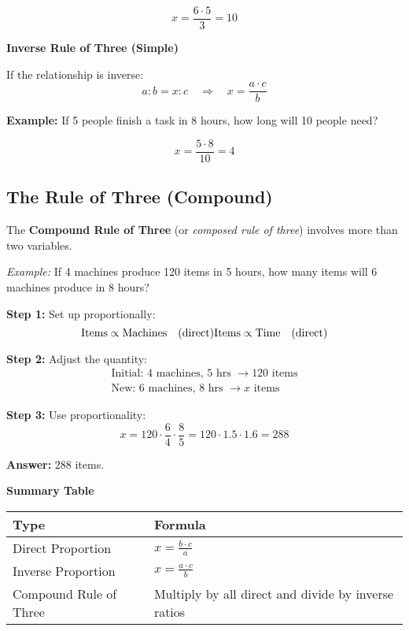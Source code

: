 \[
x = \frac{6 \cdot 5}{3} = 10
\]

\textbf{Inverse Rule of Three (Simple)}

If the relationship is inverse:
\[
a : b = x : c \quad \Rightarrow \quad x = \frac{a \cdot c}{b}
\]

\textbf{Example:} If 5 people finish a task in 8 hours, how long will 10 people need?

\[
x = \frac{5 \cdot 8}{10} = 4
\]

\subsection{The Rule of Three (Compound)}

The \textbf{Compound Rule of Three} (or \textit{composed rule of three}) involves more than two variables.

\textit{Example:} If 4 machines produce 120 items in 5 hours, how many items will 6 machines produce in 8 hours?

\textbf{Step 1:} Set up proportionally:
\[
\text{Items} \propto \text{Machines} \quad (\text{direct}) \\
\text{Items} \propto \text{Time} \quad (\text{direct})
\]

\textbf{Step 2:} Adjust the quantity:
\begin{align*}
\text{Initial: } 4 \text{ machines, } 5 \text{ hrs } \rightarrow 120 \text{ items} \\
\text{New: } 6 \text{ machines, } 8 \text{ hrs } \rightarrow x \text{ items}
\end{align*}

\textbf{Step 3:} Use proportionality:
\[
x = 120 \cdot \frac{6}{4} \cdot \frac{8}{5} = 120 \cdot 1.5 \cdot 1.6 = 288
\]

\textbf{Answer:} 288 items.

\textbf{Summary Table}

\begin{center}
\begin{tabular}{|l|l|}
\hline
\textbf{Type} & \textbf{Formula} \\
\hline
Direct Proportion & \(x = \frac{b \cdot c}{a}\) \\
Inverse Proportion & \(x = \frac{a \cdot c}{b}\) \\
Compound Rule of Three & Multiply by all direct and divide by inverse ratios \\
\hline
\end{tabular}
\end{center}

\newpage
